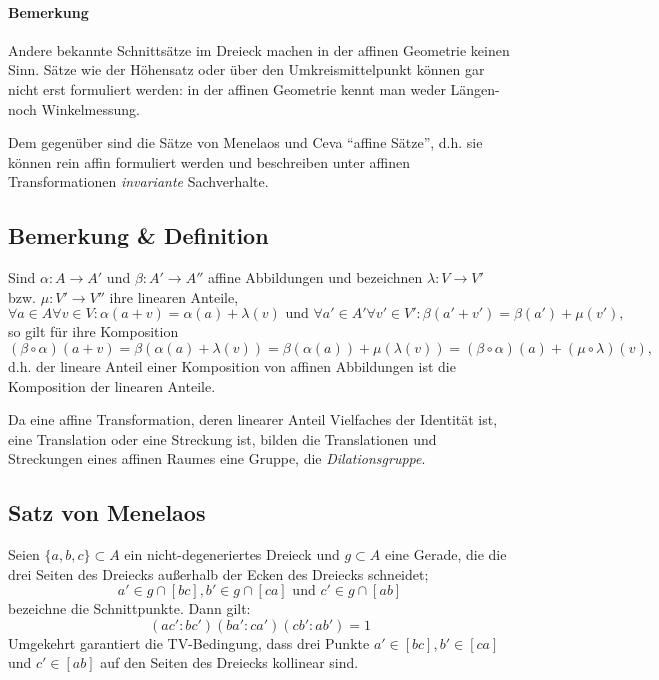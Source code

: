 \paragraph{Bemerkung}
	Andere bekannte Schnittsätze im Dreieck machen in der affinen Geometrie keinen Sinn. Sätze wie der Höhensatz oder über den Umkreismittelpunkt können gar nicht erst formuliert werden: in der affinen Geometrie kennt man weder Längen- noch Winkelmessung.
	
	Dem gegenüber sind die Sätze von Menelaos und Ceva "`affine Sätze"', d.h. sie können rein affin formuliert werden und beschreiben unter affinen Transformationen \emph{invariante} Sachverhalte.
\subsection{Bemerkung \& Definition}
	Sind $ \alpha:A\to A' $ und $ \beta:A'\to A'' $ affine Abbildungen und bezeichnen $ \lambda:V\to V' $ bzw. $ \mu:V'\to V'' $ ihre linearen Anteile,
		\[ \forall a\in A\forall v\in V:\alpha(a+v) = \alpha(a)+\lambda(v)\text{ und }\forall a'\in A'\forall v'\in V':\beta(a'+v') = \beta(a')+\mu(v'), \]
	so gilt für ihre Komposition
		\[ (\beta\circ\alpha)(a+v) = \beta(\alpha(a)+\lambda(v)) = \beta(\alpha(a))+\mu(\lambda(v)) = (\beta\circ\alpha)(a)+(\mu\circ\lambda)(v), \]
	d.h. der lineare Anteil einer Komposition von affinen Abbildungen ist die Komposition der linearen Anteile.
	
	\begin{Definition}[Dilationsgruppe]
	Da eine affine Transformation, deren linearer Anteil Vielfaches der Identität ist, eine Translation oder eine Streckung ist, bilden die Translationen und Streckungen eines affinen Raumes eine Gruppe, die \emph{Dilationsgruppe}.
	\end{Definition}
	
\subsection{Satz von Menelaos}
	\begin{Satz}
		Seien $ \{a,b,c\}\subset A $ ein nicht-degeneriertes Dreieck und $ g\subset A $ eine Gerade, die die drei Seiten des Dreiecks außerhalb der Ecken des Dreiecks schneidet;
			\[ a'\in g\cap [bc],b'\in g\cap [ca] \text{ und }c'\in g\cap [ab] \]
		bezeichne die Schnittpunkte. Dann gilt:
			\[ (ac':bc')(ba':ca')(cb':ab') = 1 \]
		Umgekehrt garantiert die TV-Bedingung, dass drei Punkte $ a'\in [bc],b'\in [ca] $ und $ c'\in [ab] $ auf den Seiten des Dreiecks kollinear sind.
	\end{Satz}
	
